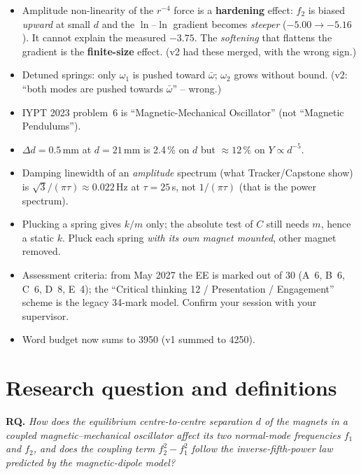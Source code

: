 \documentclass[11pt,a4paper]{article}
\newcommand{\Y}{Y}                       %
\begin{document}
\begin{warnbox}\small
\begin{itemize}
\item Amplitude non-linearity of the $r^{-4}$ force is a \textbf{hardening} effect: $f_2$ is
biased \emph{upward} at small $d$ and the $\ln$--$\ln$ gradient becomes \emph{steeper}
($-5.00\to-5.16$). It cannot explain the measured $-3.75$. The \emph{softening} that flattens
the gradient is the \textbf{finite-size} effect. (v2 had these merged, with the wrong sign.)
\item Detuned springs: only $\omega_1$ is pushed toward $\bar\omega$; $\omega_2$ grows without
bound. (v2: ``both modes are pushed towards $\bar\omega$'' -- wrong.)
\item IYPT 2023 problem~6 is ``Magnetic-Mechanical Oscillator'' (not ``Magnetic Pendulums'').
\item $\Delta d=0.5$\,mm at $d=21$\,mm is 2.4\,\% on $d$ but $\approx12\,\%$ on $\Y\propto d^{-5}$.
\item Damping linewidth of an \emph{amplitude} spectrum (what Tracker/Capstone show) is
$\sqrt3/(\pi\tau)\approx0.022$\,Hz at $\tau=25$\,s, not $1/(\pi\tau)$ (that is the power spectrum).
\item Plucking a spring gives $k/m$ only; the absolute test of $C$ still needs $m$, hence a
static $k$. Pluck each spring \emph{with its own magnet mounted}, other magnet removed.
\item Assessment criteria: from May 2027 the EE is marked out of 30 (A~6, B~6, C~6, D~8, E~4);
the ``Critical thinking 12 / Presentation / Engagement'' scheme is the legacy 34-mark model.
Confirm your session with your supervisor.
\item Word budget now sums to 3950 (v1 summed to 4250).
\end{itemize}
\end{warnbox}

\tableofcontents
\bigskip

\section{Research question and definitions}

\textbf{RQ.} \emph{How does the equilibrium centre-to-centre separation $d$ of the magnets in a
coupled magnetic--mechanical oscillator affect its two normal-mode frequencies $f_1$ and $f_2$,
and does the coupling term $f_2^2-f_1^2$ follow the inverse-fifth-power law predicted by the
magnetic-dipole model?}
\end{document}
